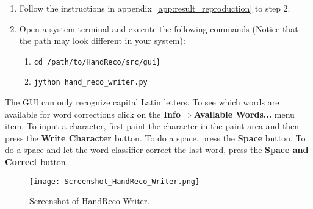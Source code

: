 \begin{enumerate}
 \item Follow the instructions in appendix~\ref{app:result_reproduction} to step 2.
 \item Open a system terminal and execute the following commands (Notice that the path may look different in your system):
 \begin{enumerate}
  \item \verb|cd /path/to/HandReco/src/gui}|
  \item \verb|jython hand_reco_writer.py|
 \end{enumerate}
\end{enumerate}

The GUI can only recognize capital Latin letters. 
To see which words are available for word corrections click on the \textbf{Info$\Rightarrow$Available Words...} menu item. 
To input a character, first paint the character in the paint area and then press the \textbf{Write Character} button. 
To do a space, press the \textbf{Space} button. 
To do a space and let the word classifier correct the last word, press the \textbf{Space and Correct} button.

    \begin{figure}[htb] 
      \begin{center}
	\leavevmode
	\texttt{[image: Screenshot\_HandReco\_Writer.png]}%
      \end{center}
      \caption{Screenshot of HandReco Writer.}
      \label{fig:hand_reco_writer_screenshot}
    \end{figure}
